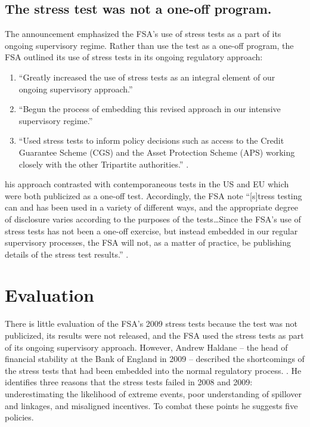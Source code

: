 \documentclass[12pt]{article}
\begin{document}
\subsection{The stress test was not a one-off program.}

The announcement emphasized the FSA's use of stress tests as a part of its ongoing supervisory regime. Rather than use the test as a one-off program, the FSA outlined its use of stress tests in its ongoing regulatory approach:

\begin{enumerate}
	\item ``Greatly increased the use of stress tests as an integral element of our ongoing supervisory approach.''
	\item ``Begun the process of embedding this revised approach in our intensive supervisory regime.''
	\item ``Used stress tests to inform policy decisions such as access to the Credit Guarantee Scheme (CGS) and the Asset Protection Scheme (APS) working closely with the other Tripartite authorities.'' \citep{Results}. 
\end{enumerate}

his approach contrasted with contemporaneous tests in the US and EU which were both publicized as a one-off test. Accordingly, the FSA note ``[s]tress testing can and has been used in a variety of different ways, and the appropriate degree of disclosure varies according to the purposes of the tests\dots Since the FSA’s use of stress tests has not been a one-off exercise, but instead embedded in our regular supervisory processes, the FSA will not, as a matter of practice, be publishing details of the stress test results.'' \citep{Results}.

\section{Evaluation}

There is little evaluation of the FSA's 2009 stress tests because the test was not publicized, its results were not released, and the FSA used the stress tests as part of its ongoing supervisory approach. However, Andrew Haldane -- the head of financial stability at the Bank of England in 2009 -- described the shortcomings of the stress tests that had been embedded into the normal regulatory process. \citep{Haldane}. He identifies three reasons that the stress tests failed in 2008 and 2009: underestimating the likelihood of extreme events, poor understanding of spillover and linkages, and misaligned incentives. To combat these points he suggests five policies. 
\end{document}
